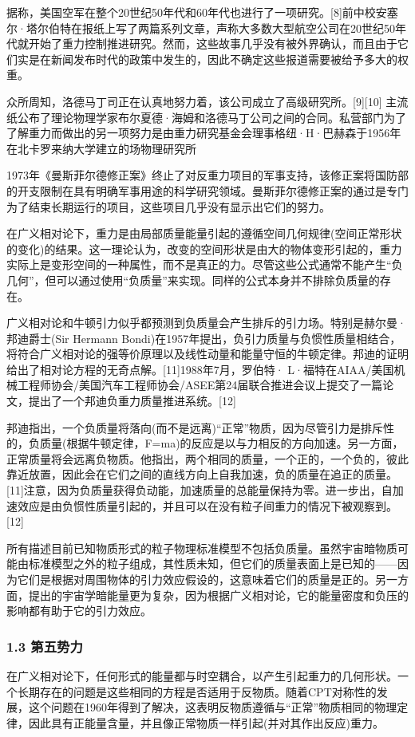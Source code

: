 据称，美国空军在整个20世纪50年代和60年代也进行了一项研究。[8]前中校安塞尔·塔尔伯特在报纸上写了两篇系列文章，声称大多数大型航空公司在20世纪50年代就开始了重力控制推进研究。然而，这些故事几乎没有被外界确认，而且由于它们实是在新闻发布时代的政策中发生的，因此不确定这些报道需要被给予多大的权重。

众所周知，洛德马丁司正在认真地努力着，该公司成立了高级研究所。[9][10] 主流纸公布了理论物理学家布尔夏德·海姆和洛德马丁公司之间的合同。私营部门为了了解重力而做出的另一项努力是由重力研究基金会理事格纽·H·巴赫森于1956年在北卡罗来纳大学建立的场物理研究所

1973年《曼斯菲尔德修正案》终止了对反重力项目的军事支持，该修正案将国防部的开支限制在具有明确军事用途的科学研究领域。曼斯菲尔德修正案的通过是专门为了结束长期运行的项目，这些项目几乎没有显示出它们的努力。

在广义相对论下，重力是由局部质量能量引起的遵循空间几何规律(空间正常形状的变化)的结果。这一理论认为，改变的空间形状是由大的物体变形引起的，重力实际上是变形空间的一种属性，而不是真正的力。尽管这些公式通常不能产生“负几何”，但可以通过使用“负质量”来实现。同样的公式本身并不排除负质量的存在。

广义相对论和牛顿引力似乎都预测到负质量会产生排斥的引力场。特别是赫尔曼·邦迪爵士(Sir Hermann Bondi)在1957年提出，负引力质量与负惯性质量相结合，将符合广义相对论的强等价原理以及线性动量和能量守恒的牛顿定律。邦迪的证明给出了相对论方程的无奇点解。[11]1988年7月，罗伯特· L·福特在AIAA/美国机械工程师协会/美国汽车工程师协会/ASEE第24届联合推进会议上提交了一篇论文，提出了一个邦迪负重力质量推进系统。[12]

邦迪指出，一个负质量将落向(而不是远离)“正常”物质，因为尽管引力是排斥性的，负质量(根据牛顿定律，F=ma)的反应是以与力相反的方向加速。另一方面，正常质量将会远离负物质。他指出，两个相同的质量，一个正的，一个负的，彼此靠近放置，因此会在它们之间的直线方向上自我加速，负的质量在追正的质量。[11]注意，因为负质量获得负动能，加速质量的总能量保持为零。进一步出，自加速效应是由负惯性质量引起的，并且可以在没有粒子间重力的情况下被观察到。[12]

所有描述目前已知物质形式的粒子物理标准模型不包括负质量。虽然宇宙暗物质可能由标准模型之外的粒子组成，其性质未知，但它们的质量表面上是已知的——因为它们是根据对周围物体的引力效应假设的，这意味着它们的质量是正的。另一方面，提出的宇宙学暗能量更为复杂，因为根据广义相对论，它的能量密度和负压的影响都有助于它的引力效应。
\subsubsection{1.3 第五势力}
在广义相对论下，任何形式的能量都与时空耦合，以产生引起重力的几何形状。一个长期存在的问题是这些相同的方程是否适用于反物质。随着CPT对称性的发展，这个问题在1960年得到了解决，这表明反物质遵循与“正常”物质相同的物理定律，因此具有正能量含量，并且像正常物质一样引起(并对其作出反应)重力。


